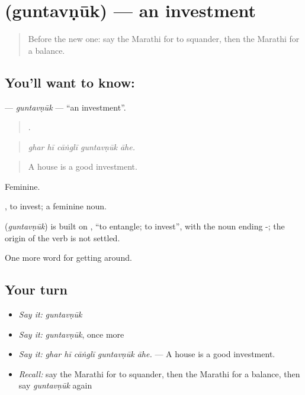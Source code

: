 \section[\texorpdfstring{\mr{गुंतवणूक} (guntavṇūk)}{गुंतवणूक (guntavṇūk)}]{ (guntavṇūk) — an investment}

\label{lesson:MR-C428-guntavnuk}



\begin{quote}
Before the new one: say the Marathi for to squander, then the Marathi for a balance.
\end{quote}

\subsection*{You'll want to know: }
\textbf{} — \emph{guntavṇūk} — \textquotedblleft{}an investment\textquotedblright{}.

\begin{quote}
    .
\end{quote}

\begin{quote}
\emph{ghar hī cāṅglī guntavṇūk āhe.}
\end{quote}

\begin{quote}
A house is a good investment.
\end{quote}

Feminine.

 , to invest; a feminine noun.

\begin{cousinweb}
\textbf{} (\emph{guntavṇūk}) is built on \textbf{}, \textquotedblleft{}to entangle; to invest\textquotedblright{}, with the noun ending -; the origin of the verb is not settled.
\end{cousinweb}

\begin{grammarlens}[title={What you've built}]
One more word for getting around.
\end{grammarlens}

\subsection*{Your turn}
\begin{itemize}
\raggedright
  \item \emph{Say it:} \emph{guntavṇūk}
  \item \emph{Say it:} \emph{guntavṇūk}, once more
  \item \emph{Say it:} \emph{ghar hī cāṅglī guntavṇūk āhe.} — A house is a good investment.
  \item \emph{Recall:} say the Marathi for to squander, then the Marathi for a balance, then say \emph{guntavṇūk} again
\end{itemize}

